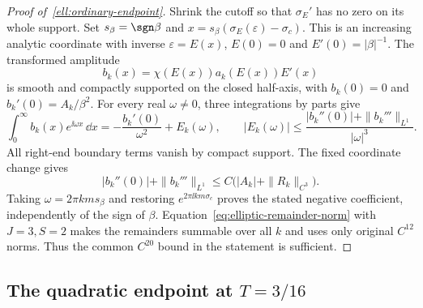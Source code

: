 \begin{proof}[Proof of~\eqref{ell:ordinary-endpoint}]
Shrink the cutoff so that $\sigma_E'$ has no zero on its whole support.
Set $s_\beta=\sgn\beta$ and
$x=s_\beta(\sigma_E(\varepsilon)-\sigma_c)$.  This is an increasing
analytic coordinate with inverse $\varepsilon=E(x)$,
$E(0)=0$ and $E'(0)=|\beta|^{-1}$.  The transformed amplitude
\[
 b_k(x)=\chi(E(x))a_k(E(x))E'(x)
\]
is smooth and compactly supported on the closed half-axis, with
$b_k(0)=0$ and $b_k'(0)=A_k/\beta^2$.  For every real $\omega\ne0$,
three integrations by parts give
\begin{equation}\label{ell:three-ibp}
 \int_0^\infty b_k(x)e^{\ii\omega x}\,\dd x
 =-\frac{b_k'(0)}{\omega^2}+E_k(\omega),\qquad
 |E_k(\omega)|\leq
 \frac{|b_k''(0)|+\|b_k'''\|_{L^1}}{|\omega|^3}.
\end{equation}
All right-end boundary terms vanish by compact support.  The fixed
coordinate change gives
\[
 |b_k''(0)|+\|b_k'''\|_{L^1}
 \leq C\bigl(|A_k|+\|R_k\|_{C^3}\bigr).
\]
Taking $\omega=2\pi km s_\beta$ and restoring
$e^{2\pi\ii km\sigma_c}$ proves the stated negative coefficient,
independently of the sign of $\beta$.
Equation~\eqref{eq:elliptic-remainder-norm} with $J=3,S=2$ makes the
remainders summable over all $k$ and uses only original $C^{12}$ norms.
Thus the common $C^{20}$ bound in the statement is sufficient.
\end{proof}

\subsection{The quadratic endpoint at $T=3/16$}

